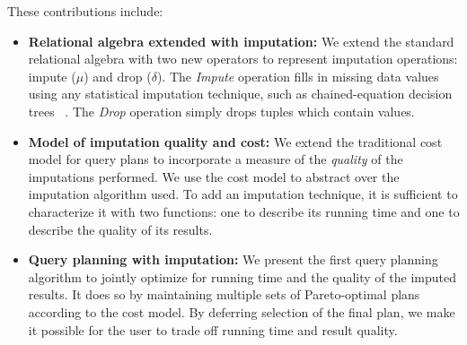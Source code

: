 These contributions include:
\begin{itemize}
\item \textbf{Relational algebra extended with imputation:}
  We extend the standard relational algebra with two new operators to represent imputation operations: impute ($\mu$) and drop ($\delta$).
  The \textit{Impute} operation fills in missing data values using any statistical imputation
  technique, such as chained-equation decision trees ~\cite{burgette2010multiple}.
  The \textit{Drop} operation simply drops tuples which contain \nullv{} values.
\item \textbf{Model of imputation quality and cost:}
  We extend the traditional cost model for query plans to incorporate a measure of the
  \textit{quality} of the imputations performed.
  We use the cost model to abstract over the imputation algorithm used.
  To add an imputation technique, it is sufficient to characterize it with two functions: one to describe its running time and one to describe the quality of its results.
\item \textbf{Query planning with imputation:}
  We present the first query planning algorithm to jointly optimize for running time and the quality of the imputed results.
  It does so by maintaining multiple sets of Pareto-optimal plans according to the cost model.
  By deferring selection of the final plan, we make it possible for the user to trade off running time and result quality.
\end{itemize}





